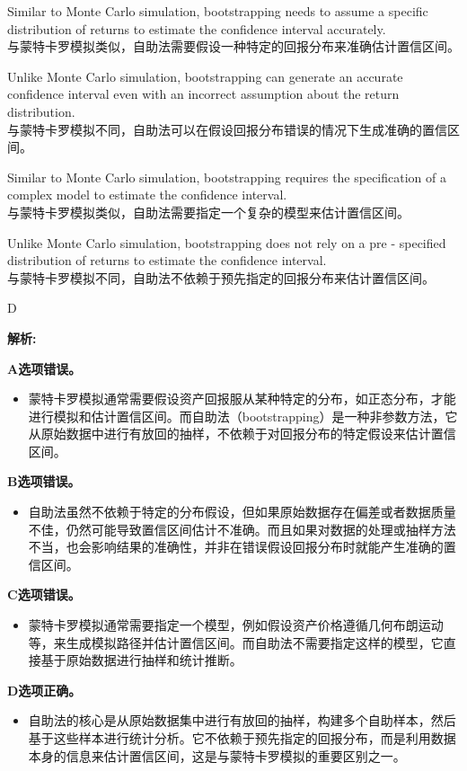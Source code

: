 \documentclass{article}
\newenvironment{explanation}
{\textbf{解析:}\par}
{\par}
\begin{document}
    \begin{choices}
        \item Similar to Monte Carlo simulation, bootstrapping needs to assume a specific distribution of returns to estimate the confidence interval accurately.\\
        与蒙特卡罗模拟类似，自助法需要假设一种特定的回报分布来准确估计置信区间。
        \item Unlike Monte Carlo simulation, bootstrapping can generate an accurate confidence interval even with an incorrect assumption about the return distribution.\\
        与蒙特卡罗模拟不同，自助法可以在假设回报分布错误的情况下生成准确的置信区间。
        \item Similar to Monte Carlo simulation, bootstrapping requires the specification of a complex model to estimate the confidence interval.\\
        与蒙特卡罗模拟类似，自助法需要指定一个复杂的模型来估计置信区间。
        \item Unlike Monte Carlo simulation, bootstrapping does not rely on a pre - specified distribution of returns to estimate the confidence interval.\\
        与蒙特卡罗模拟不同，自助法不依赖于预先指定的回报分布来估计置信区间。
    \end{choices}
    
    \begin{correctanswer}
        D
    \end{correctanswer}
    
    \begin{explanation}
    \textbf{A选项错误。}
    \begin{itemize}
        \item 蒙特卡罗模拟通常需要假设资产回报服从某种特定的分布，如正态分布，才能进行模拟和估计置信区间。而自助法（bootstrapping）是一种非参数方法，它从原始数据中进行有放回的抽样，不依赖于对回报分布的特定假设来估计置信区间。
    \end{itemize}
    \textbf{B选项错误。}
    \begin{itemize}
        \item 自助法虽然不依赖于特定的分布假设，但如果原始数据存在偏差或者数据质量不佳，仍然可能导致置信区间估计不准确。而且如果对数据的处理或抽样方法不当，也会影响结果的准确性，并非在错误假设回报分布时就能产生准确的置信区间。
    \end{itemize}
    \textbf{C选项错误。}
    \begin{itemize}
        \item 蒙特卡罗模拟通常需要指定一个模型，例如假设资产价格遵循几何布朗运动等，来生成模拟路径并估计置信区间。而自助法不需要指定这样的模型，它直接基于原始数据进行抽样和统计推断。
    \end{itemize}
    \textbf{D选项正确。}
    \begin{itemize}
        \item 自助法的核心是从原始数据集中进行有放回的抽样，构建多个自助样本，然后基于这些样本进行统计分析。它不依赖于预先指定的回报分布，而是利用数据本身的信息来估计置信区间，这是与蒙特卡罗模拟的重要区别之一。
    \end{itemize}
    \end{explanation}
    
\end{document}
